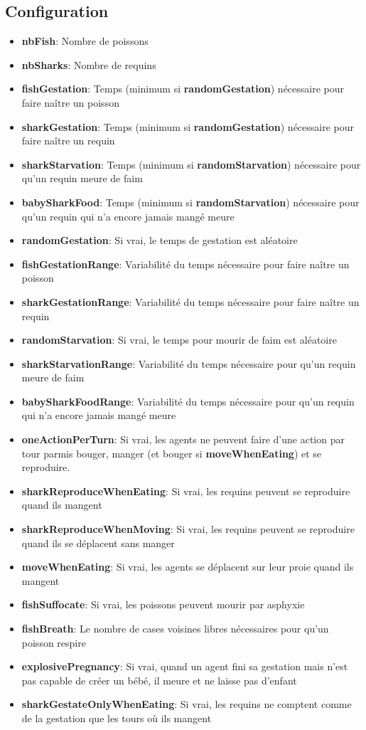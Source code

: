 \documentclass[11pt,a4paper,oneside]{report}
\begin{document}
\subsection*{Configuration}
\begin{itemize}
\item \textbf{nbFish}: Nombre de poissons
\item \textbf{nbSharks}: Nombre de requins
\item \textbf{fishGestation}: Temps (minimum si \textbf{randomGestation}) nécessaire pour faire naître un poisson
\item \textbf{sharkGestation}: Temps (minimum si \textbf{randomGestation}) nécessaire pour faire naître un requin
\item \textbf{sharkStarvation}: Temps (minimum si \textbf{randomStarvation}) nécessaire pour qu'un requin meure de faim
\item \textbf{babySharkFood}: Temps (minimum si \textbf{randomStarvation}) nécessaire pour qu'un requin qui n'a encore jamais mangé meure
\item \textbf{randomGestation}: Si vrai, le temps de gestation est aléatoire
\item \textbf{fishGestationRange}: Variabilité du temps nécessaire pour faire naître un poisson
\item \textbf{sharkGestationRange}: Variabilité du temps nécessaire pour faire naître un requin
\item \textbf{randomStarvation}: Si vrai, le temps pour mourir de faim est aléatoire
\item \textbf{sharkStarvationRange}: Variabilité du temps nécessaire pour qu'un requin meure de faim
\item \textbf{babySharkFoodRange}: Variabilité du temps nécessaire pour qu'un requin qui n'a encore jamais mangé meure
\item \textbf{oneActionPerTurn}: Si vrai, les agents ne peuvent faire d'une action par tour parmis bouger, manger (et bouger si \textbf{moveWhenEating}) et se reproduire.
\item \textbf{sharkReproduceWhenEating}: Si vrai, les requins peuvent se reproduire quand ils mangent
\item \textbf{sharkReproduceWhenMoving}: Si vrai, les requins peuvent se reproduire quand ils se déplacent sans manger
\item \textbf{moveWhenEating}: Si vrai, les agents se déplacent sur leur proie quand ils mangent
\item \textbf{fishSuffocate}: Si vrai, les poissons peuvent mourir par asphyxie
\item \textbf{fishBreath}: Le nombre de cases voisines libres nécessaires pour qu'un poisson respire
\item \textbf{explosivePregnancy}: Si vrai, quand un agent fini sa gestation mais n'est pas capable de créer un bébé, il meure et ne laisse pas d'enfant
\item \textbf{sharkGestateOnlyWhenEating}: Si vrai, les requins ne comptent comme de la gestation que les tours où ils mangent
\end{itemize}
\end{document}
